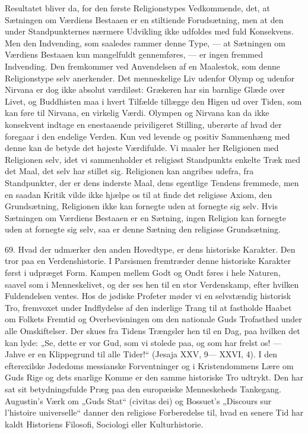 \documentclass[12pt,a4paper,openany]{book}
\newcommand{\opage}[1]{\marginnote{\footnotesize\textit{[#1]}}}
\begin{document}
Resultatet bliver da, for den første Religionstypes Vedkommende, det, at
Sætningen om Værdiens Bestaaen er en stiltiende Forudsætning, men at den
under Standpunkternes nærmere Udvikling ikke udfoldes med fuld
Konsekvens. Men den Indvending, som saaledes rammer denne Type, --- at
Sætningen om Værdiens Bestaaen kun mangelfuldt gennemføres, --- er ingen
fremmed Indvending. Den fremkommer ved Anvendelsen af en Maalestok, som
denne Religionstype selv anerkender. Det menneskelige Liv udenfor Olymp
og udenfor Nirvana er dog ikke absolut værdiløst: Grækeren har sin
barnlige Glæde over Livet, og Buddhisten maa i hvert Tilfælde tillægge
den Higen ud over Tiden, som kan føre til Nirvana, en virkelig Værdi.
Olympen og Nirvana kan da ikke konsekvent indtage en enestaaende
priviligeret Stilling, uberørte af hvad der foregaar i den endelige
Verden. Kun ved levende og positiv Sammenhæng med denne kan de betyde
det højeste Værdifulde. Vi maaler her Religionen med Religionen selv,
idet vi sammenholder et religiøst Standpunkts enkelte Træk med det Maal,
det selv har stillet sig. Religionen kan angribes udefra, fra
Standpunkter, der er dens inderste Maal, dens egentlige Tendens
fremmede, men en saadan Kritik vilde ikke hjælpe os til at finde det
religiøse Axiom, den Grundsætning, Religionen ikke kan fornegte uden at
fornegte sig selv. Hvis Sætningen om Værdiens Bestaaen er en Sætning,
ingen Religion kan fornegte uden at fornegte sig selv, saa er denne
Sætning den religiøse Grundsætning.

69. Hvad der udmærker den anden Hovedtype, er dens historiske Karakter.
Den tror paa en Verdenshistorie. I Parsismen fremtræder denne historiske
Karakter først i udpræget Form. Kampen mellem Godt og Ondt føres i hele
Naturen, saavel som i Menneskelivet, og der ses hen til en stor
Verdenskamp, efter hvilken Fuldendelsen ventes. Hos de jødiske Profeter
møder vi en selvstændig historisk Tro, fremvoxet under Indflydelse af
den inderlige Trang til at fastholde Haabet om Folkets Fremtid og
Overbevisningen om den nationale Guds Trofasthed under alle
Omskiftelser. Der skues fra Tidens Trængsler hen til en Dag, paa hvilken
det kan lyde: „Se, dette er vor Gud, som vi stolede paa, og som har
frelst os! --- Jahve er en Klippegrund til alle Tider!“ (Jesaja XXV,
9--- XXVI, 4). I den efterexilske Jødedoms messianske Forventninger og i
Kristendommens Lære om
\opage{159}Guds Rige og dets snarlige Komme er den samme historiske Tro
udtrykt. Den har sat sit betydningsfulde Præg paa den europæiske
Menneskeheds Tankegang. Augustin’s Værk om „Guds Stat“ (civitas dei) og
Bossuet’s „Discours sur l’histoire universelle“ danner den religiøse
Forberedelse til, hvad en senere Tid har kaldt Historiens Filosofi,
Sociologi eller Kulturhistorie.
\end{document}
